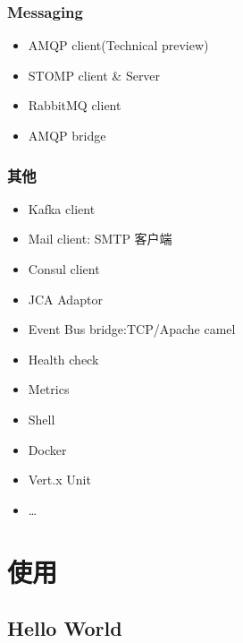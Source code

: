 \documentclass[12pt]{article}
\begin{document}
\subsubsection{Messaging}\label{messaging}

\begin{itemize}
\tightlist
\item
  AMQP client(Technical preview)
\item
  STOMP client \& Server
\item
  RabbitMQ client
\item
  AMQP bridge
\end{itemize}

\subsubsection{其他}\label{ux5176ux4ed6}

\begin{itemize}
\tightlist
\item
  Kafka client
\item
  Mail client: SMTP 客户端
\item
  Consul client
\item
  JCA Adaptor
\item
  Event Bus bridge:TCP/Apache camel
\item
  Health check
\item
  Metrics
\item
  Shell
\item
  Docker
\item
  Vert.x Unit
\item
  \ldots{}
\end{itemize}

\section{使用}\label{ux4f7fux7528}

\subsection{Hello World}\label{hello-world}
\end{document}
